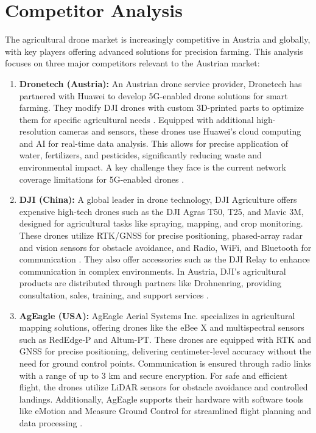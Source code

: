 \section{Competitor Analysis}

The agricultural drone market is increasingly competitive in Austria and globally, with key players offering advanced solutions for precision farming. This analysis focuses on three major competitors relevant to the Austrian market:

\begin{enumerate} 
	\item \textbf{Dronetech (Austria):} An Austrian drone service provider, Dronetech has partnered with Huawei to develop 5G-enabled drone solutions for smart farming. They modify DJI drones with custom 3D-printed parts to optimize them for specific agricultural needs \cite{dronetech_instagram, dji_m300}. Equipped with additional high-resolution cameras and sensors, these drones use Huawei's cloud computing and AI for real-time data analysis. This allows for precise application of water, fertilizers, and pesticides, significantly reducing waste and environmental impact. A key challenge they face is the current network coverage limitations for 5G-enabled drones \cite{huawei_dronetech_2022, huawei_boosting_farming_2022, dronetech_smart_farming_project}.

	\item \textbf{DJI (China):} A global leader in drone technology, DJI Agriculture offers expensive high-tech drones such as the DJI Agras T50, T25, and Mavic 3M, designed for agricultural tasks like spraying, mapping, and crop monitoring. These drones utilize RTK/GNSS for precise positioning, phased-array radar and vision sensors for obstacle avoidance, and Radio, WiFi, and Bluetooth for communication \cite{dji_ag_t25, dji_ag_t50}. They also offer accessories such as the DJI Relay to enhance communication in complex environments. In Austria, DJI's agricultural products are distributed through partners like Drohnenring, providing consultation, sales, training, and support services \cite{drohnenring_2024, dji_agriculture_2024}.
	
	\item \textbf{AgEagle (USA):} AgEagle Aerial Systems Inc. specializes in agricultural mapping solutions, offering drones like the eBee X and multispectral sensors such as RedEdge-P and Altum-PT. These drones are equipped with RTK and GNSS for precise positioning, delivering centimeter-level accuracy without the need for ground control points. Communication is ensured through radio links with a range of up to 3 km and secure encryption. For safe and efficient flight, the drones utilize LiDAR sensors for obstacle avoidance and controlled landings. Additionally, AgEagle supports their hardware with software tools like eMotion and Measure Ground Control for streamlined flight planning and data processing \cite{ageagle_agriculture_2024, ageagle_agriculture_ebee}.
\end{enumerate}

